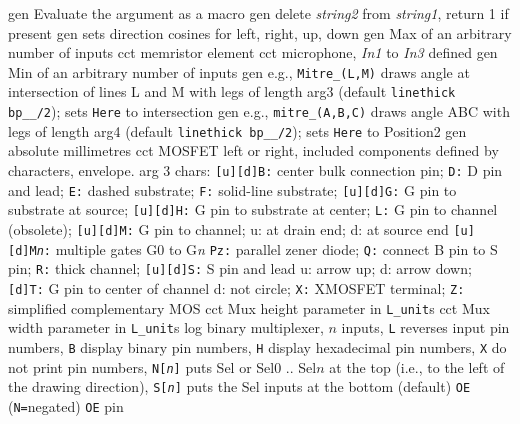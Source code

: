   {gen}
  {Evaluate the argument as a macro}
  {gen}
  {delete {\sl string2} from {\sl string1}, return 1 if present}
  {gen}
  {sets direction cosines for left, right, up, down}
  {gen}
  {Max of an arbitrary number of inputs}
  {cct}
  {memristor element}
  {cct}
  {microphone, {\sl In1} to {\sl In3} defined
   }
  {gen}
  {Min of an arbitrary number of inputs}
  {gen}
  {e.g., {\tt Mitre\_(L,M)} draws angle at intersection of lines
   L and M with legs of length arg3 (default {\tt linethick bp\_\_/2});
   sets {\tt Here} to intersection
    }
  {gen}
  {e.g., {\tt mitre\_(A,B,C)} draws angle ABC with legs
   of length arg4 (default {\tt linethick bp\_\_/2});
   sets {\tt Here} to Position2
    }
  {gen}
  {absolute millimetres}
  {cct}
  {MOSFET left or right, included components defined by characters, envelope.
   arg 3 chars:
      {\tt [u][d]B:} center bulk connection pin;
      {\tt D:} D pin and lead;
      {\tt E:} dashed substrate;
      {\tt F:} solid-line substrate;
      {\tt [u][d]G:} G pin to substrate at source;
      {\tt [u][d]H:} G pin to substrate at center;
      {\tt L:} G pin to channel (obsolete);
      {\tt [u][d]M:} G pin to channel; u: at drain end; d: at source end
      {\tt [u][d]M{\sl n}:} multiple gates G0 to G{\sl n}
      {\tt Pz:} parallel zener diode;
      {\tt Q:} connect B pin to S pin;
      {\tt R:} thick channel;
      {\tt [u][d]S:} S pin and lead u: arrow up; d: arrow down;
      {\tt [d]T:} G pin to center of channel d: not circle;
      {\tt X:} XMOSFET terminal;
      {\tt Z:} simplified complementary MOS
    }
  {cct}
  {Mux height parameter in {\tt L\_unit}s}
  {cct}
  {Mux width parameter in {\tt L\_unit}s}
  {log}
  {binary multiplexer, $n$ inputs,
    {\tt L} reverses input pin numbers,
    {\tt B} display binary pin numbers,
    {\tt H} display hexadecimal pin numbers,
    {\tt X} do not print pin numbers,
    {\tt N[{\sl n}]} puts Sel or Sel$0$ .. Sel$n$ at the top
    (i.e., to the left of the drawing direction),
    {\tt S[{\sl n}]} puts the Sel inputs at the bottom (default)
    {\tt OE} ({\tt N=}negated) {\tt OE} pin
    }
